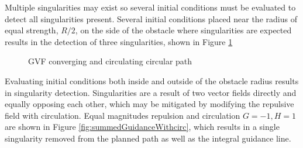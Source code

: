 \documentclass[numbered,pdftex]{ohio-etd}
\begin{document}
 Multiple singularities may exist so several initial conditions must be evaluated to detect all singularities present. Several initial conditions placed near the radius of equal strength, $R/2$, on the side of the obstacle where singularities are expected results in the detection of three singularities, shown in Figure \ref{fig:noCircSingularityDetection}
 
 
\begin{figure}[H]
	\begin{subfigmatrix}{2}%
		\centering	
		\hspace*{0mm}
	\end{subfigmatrix}
	\caption{GVF converging and circulating circular path}
	\label{fig:noCircSingularityDetection}
\end{figure}

Evaluating initial conditions both inside and outside of the obstacle radius results in singularity detection. Singularities are a result of two vector fields directly and equally opposing each other, which may be mitigated by modifying the repulsive field with circulation. Equal magnitudes repulsion and circulation $G=-1,H=1$ are shown in Figure \ref{fig:summedGuidanceWithcirc}, which results in a single singularity removed from the planned path as well as the integral guidance line. 
\end{document}

